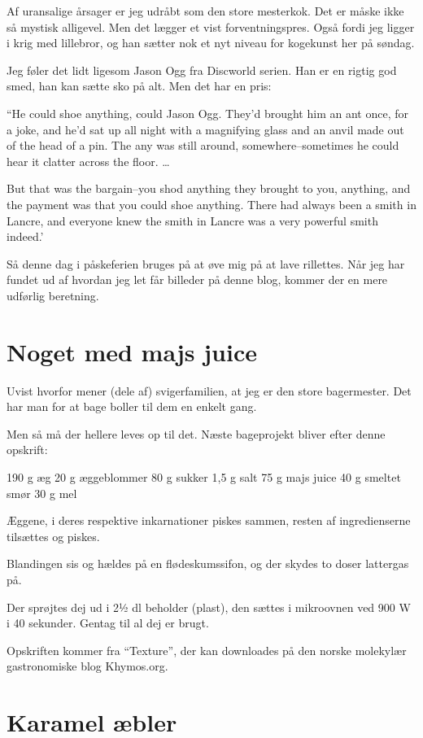 \documentclass[
]{book}
\begin{document}
Af uransalige årsager er jeg udråbt som den store mesterkok. Det er måske ikke så mystisk alligevel. Men det lægger et vist forventningspres. Også fordi jeg ligger i krig med lillebror, og han sætter nok et nyt niveau for kogekunst her på søndag.

Jeg føler det lidt ligesom Jason Ogg fra Discworld serien. Han er en rigtig god smed, han kan sætte sko på alt. Men det har en pris:

``He could shoe anything, could Jason Ogg. They'd brought him an ant once, for a joke, and he'd sat up all night with a magnifying glass and an anvil made out of the head of a pin. The any was still around, somewhere--sometimes he could hear it clatter across the floor. \ldots{}

But that was the bargain--you shod anything they brought to you, anything, and the payment was that you could shoe anything. There had always been a smith in Lancre, and everyone knew the smith in Lancre was a very powerful smith indeed.'

Så denne dag i påskeferien bruges på at øve mig på at lave rillettes. Når jeg har fundet ud af hvordan jeg let får billeder på denne blog, kommer der en mere udførlig beretning.

\hypertarget{noget-med-majs-juice}{%
\section{Noget med majs juice}\label{noget-med-majs-juice}}

Uvist hvorfor mener (dele af) svigerfamilien, at jeg er den store bagermester. Det har man for at bage boller til dem en enkelt gang.

Men så må der hellere leves op til det. Næste bageprojekt bliver efter denne opskrift:

190 g æg
20 g æggeblommer
80 g sukker
1,5 g salt
75 g majs juice
40 g smeltet smør
30 g mel

Æggene, i deres respektive inkarnationer piskes sammen, resten af ingredienserne tilsættes og piskes.

Blandingen sis og hældes på en flødeskumssifon, og der skydes to doser lattergas på.

Der sprøjtes dej ud i 2½ dl beholder (plast), den sættes i mikroovnen ved 900 W i 40 sekunder. Gentag til al dej er brugt.

Opskriften kommer fra ``Texture'', der kan downloades på den norske molekylær gastronomiske blog Khymos.org.

\hypertarget{karamel-uxe6bler}{%
\section{Karamel æbler}\label{karamel-uxe6bler}}
\end{document}
